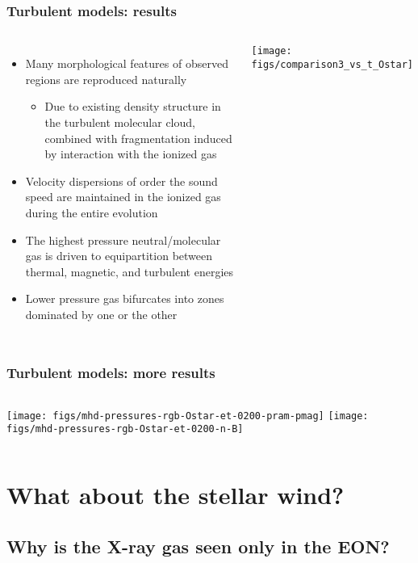 \documentclass[presentation]{beamer}
\begin{document}
\begin{frame}[plain]%
\hspace*{-1ex}
\end{frame}

\begin{frame}
  \frametitle{Turbulent models: results}
  \begin{columns}
    \begin{itemize}
    \item Many morphological features of observed \hii{} regions are
      reproduced naturally
      \begin{itemize}
      \item Due to existing density structure in the
        turbulent molecular cloud, combined with fragmentation induced
        by interaction with the ionized gas
      \end{itemize}
    \item Velocity dispersions of order the sound speed are
      maintained in the ionized gas during the entire evolution
    \item The highest pressure neutral/molecular gas is driven to
      equipartition between thermal, magnetic, and turbulent energies
    \item Lower pressure gas bifurcates into zones dominated by one or
      the other
    \end{itemize}
    \texttt{[image: figs/comparison3\_vs\_t\_Ostar]}%
  \end{columns}
\end{frame}

\begin{frame}
  \frametitle{Turbulent models: more results}
  \begin{columns}
    \texttt{[image: figs/mhd-pressures-rgb-Ostar-et-0200-pram-pmag]}
    \texttt{[image: figs/mhd-pressures-rgb-Ostar-et-0200-n-B]}
  \end{columns}
\end{frame}

\section{What about the stellar wind?}



\subsection{Why is the X-ray gas seen only in the EON?}
\end{document}
